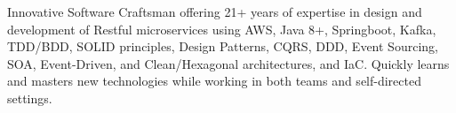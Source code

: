 

\begin{cvparagraph}

Innovative Software Craftsman offering 21+ years of expertise in design and development of Restful microservices using AWS, Java 8+, Springboot, Kafka, TDD/BDD, SOLID principles, Design Patterns, CQRS, DDD, Event Sourcing, SOA, Event-Driven, and Clean/Hexagonal architectures, and IaC. Quickly learns and masters new technologies while working in both teams and self-directed settings.
\end{cvparagraph}
